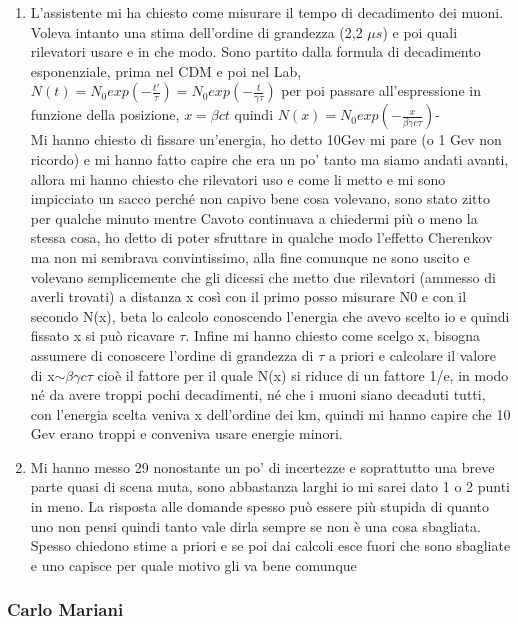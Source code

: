 \documentclass[../main.tex]{subfiles}
\begin{document}
\begin{itemize}
\begin{enumerate}
        \item L'assistente mi ha chiesto come misurare il tempo di decadimento dei muoni. Voleva intanto una stima dell'ordine di grandezza (2,2 $\mu s$) e poi quali rilevatori usare e in che modo. Sono partito dalla formula di decadimento esponenziale, prima nel CDM e poi nel Lab, $N(t)=N_0 exp(-\frac{t'}{\tau}) =N_0 exp(-\frac{t}{\gamma \tau})$ per poi passare all'espressione in funzione della posizione, $x = \beta c t$ quindi $N(x)=N_0 exp(-\frac{x}{\beta \gamma c \tau})$-\\
        Mi hanno chiesto di fissare un'energia, ho detto 10Gev mi pare (o 1 Gev non ricordo) e mi hanno fatto capire che era un po' tanto ma siamo andati avanti, allora mi hanno chiesto che rilevatori uso e come li metto e mi sono impicciato un sacco perché non capivo bene cosa volevano, sono stato zitto per qualche minuto mentre Cavoto continuava a chiedermi più o meno la stessa cosa, ho detto di poter sfruttare in qualche modo l'effetto Cherenkov ma non mi sembrava convintissimo, alla fine comunque ne sono uscito e volevano semplicemente che gli dicessi che metto due rilevatori (ammesso di averli trovati) a distanza x così con il primo posso misurare N0 e con il secondo N(x), beta lo calcolo conoscendo l'energia che avevo scelto io e quindi fissato x si può ricavare $\tau$. Infine mi hanno chiesto come scelgo x, bisogna assumere di conoscere l'ordine di grandezza di $\tau$ a priori e calcolare il valore di x$\sim \beta\gamma c\tau$ cioè il fattore per il quale N(x) si riduce di un fattore 1/e, in modo né da avere troppi pochi decadimenti, né che i muoni siano decaduti tutti, con l'energia scelta veniva x dell'ordine dei km, quindi mi hanno capire che 10 Gev erano troppi e conveniva usare energie minori.
        \item Mi hanno messo 29 nonostante un po' di incertezze e soprattutto una breve parte quasi di scena muta, sono abbastanza larghi io mi sarei dato 1 o 2 punti in  meno. La risposta alle domande spesso può essere più stupida di quanto uno non pensi quindi tanto vale dirla sempre se non è una cosa sbagliata. Spesso chiedono stime a priori e se poi dai calcoli esce fuori che sono sbagliate e uno capisce per quale motivo gli va bene comunque
    \end{enumerate}
\end{itemize}


\subsubsection{Carlo Mariani} 
\end{document}
